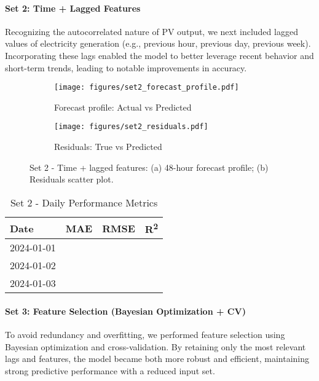 \paragraph{Set 2: Time + Lagged Features}
Recognizing the autocorrelated nature of PV output, we next included lagged values of 
electricity generation (e.g., previous hour, previous day, previous week). Incorporating 
these lags enabled the model to better leverage recent behavior and short-term trends, 
leading to notable improvements in accuracy.

\begin{figure}[H]
    \centering
    \begin{subfigure}{0.49\textwidth}
        \texttt{[image: figures/set2\_forecast\_profile.pdf]}
        \caption{Forecast profile: Actual vs Predicted}
    \end{subfigure}
    \begin{subfigure}{0.49\textwidth}
        \texttt{[image: figures/set2\_residuals.pdf]}
        \caption{Residuals: True vs Predicted}
    \end{subfigure}
    \caption{Set 2 - Time + lagged features: (a) 48-hour forecast profile; (b) Residuals scatter plot.}
\end{figure}

\begin{table}[H]
    \centering
    \caption{Set 2 - Daily Performance Metrics}
    \begin{tabular}{lccc}
        \toprule
        Date        & MAE    & RMSE   & R\textsuperscript{2} \\
        \midrule
        2024-01-01  &        &        &       \\
        2024-01-02  &        &        &       \\
        2024-01-03  &        &        &       \\
        \bottomrule
    \end{tabular}
\end{table}

\paragraph{Set 3: Feature Selection (Bayesian Optimization + CV)}
To avoid redundancy and overfitting, we performed feature selection using Bayesian 
optimization and cross-validation. By retaining only the most relevant lags and features, 
the model became both more robust and efficient, maintaining strong predictive performance 
with a reduced input set.

